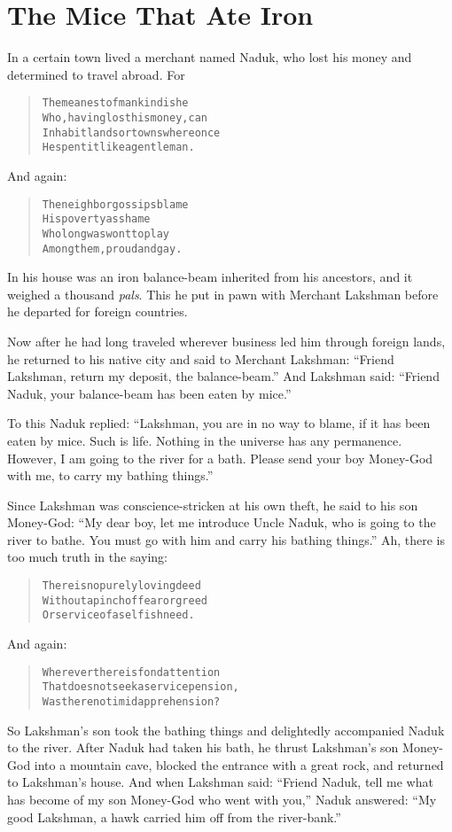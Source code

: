 \documentclass[article, twoside, 14pt]{memoir}
\renewenvironment{verbatim}{%
\begin{quote}%
\vskip -10pt%
\begin{alltt}\normalfont\large}{\end{alltt}%
\end{quote}%
\vskip -10pt
} %
\begin{document}
\chapter{The Mice That Ate Iron}

\label{s31}

In a certain town lived a merchant named Naduk, who lost his money
and determined to travel abroad. For

\begin{verbatim}
The meanest of mankind is he
    Who, having lost his money, can
Inhabit lands or towns where once
    He spent it like a gentleman.
\end{verbatim}
And again:

\begin{verbatim}
The neighbor gossips blame
His poverty as shame
Who long was wont to play
Among them, proud and gay.
\end{verbatim}
In his house was an iron balance-beam inherited from his ancestors,
and it weighed a thousand \emph{pals}. This he put in pawn with
Merchant Lakshman before he departed for foreign countries.

Now after he had long traveled wherever business led him through
foreign lands, he returned to his native city and said to Merchant
Lakshman: ``Friend Lakshman, return my deposit, the balance-beam.''
And Lakshman said:
``Friend Naduk, your balance-beam has been eaten by mice.''

To this Naduk replied:
``Lakshman, you are in no way to blame, if it has been eaten by mice. Such is life. Nothing in the universe has any permanence. However, I am going to the river for a bath. Please send your boy Money-God with me, to carry my bathing things.''

Since Lakshman was conscience-stricken at his own theft, he said to
his son Money-God:
``My dear boy, let me introduce Uncle Naduk, who is going to the river to bathe. You must go with him and carry his bathing things.''
Ah, there is too much truth in the saying:

\begin{verbatim}
There is no purely loving deed
Without a pinch of fear or greed
Or service of a selfish need.
\end{verbatim}
And again:

\begin{verbatim}
Wherever there is fond attention
That does not seek a service pension,
Was there no timid apprehension?
\end{verbatim}
So Lakshman's son took the bathing things and delightedly
accompanied Naduk to the river. After Naduk had taken his bath, he
thrust Lakshman's son Money-God into a mountain cave, blocked the
entrance with a great rock, and returned to Lakshman's house. And
when Lakshman said:
``Friend Naduk, tell me what has become of my son Money-God who went with you,''
Naduk answered:
``My good Lakshman, a hawk carried him off from the river-bank.''
\end{document}
